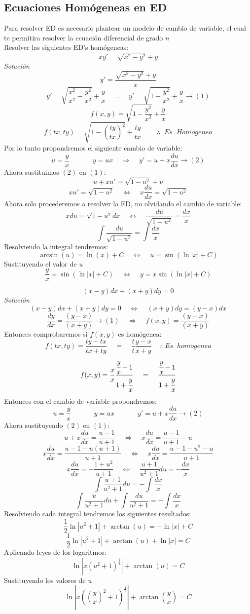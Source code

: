 \documentclass[10pt]{article}
\begin{document}
\subsection{Ecuaciones Homógeneas en ED}
Para resolver ED es necesario plantear un modelo de cambio de variable, el cual te permitira resolver la ecuación diferencial de grado $n$\\
Resolver las siguientes ED's homógeneas:
\[xy'=\sqrt{x^{2}-y^{2}}+y\]
\textit{Solución}
\[y'=\frac{\sqrt{x^{2}-y^{2}}+y}{x}\]
\[y'=\sqrt{\frac{x^{2}}{x^{2}}-\frac{y^{2}}{x^{2}}}+\frac{y}{x}\;\;\;\;\;\ldots\;\;\;\;y'=\sqrt{1-\frac{y^{2}}{x^{2}}}+\frac{y}{x}\rightarrow (1)\]
\[f(x,y)=\sqrt{1-\frac{y^{2}}{x^{2}}}+\frac{y}{x}\]
\[f(tx,ty)=\sqrt{1-\left(\frac{ty}{tx}\right)^{2}}+\frac{ty}{tx}\;\;\;\;\;\;\;\;\therefore\;\;Es\;\;Hom\acute{o}genea\]
Por lo tanto propondremos el siguiente cambio de variable:
\[u=\frac{y}{x}\;\;\;\;\;\;\;\;\;\;\;\;y=ux\;\;\;\;\Rightarrow\;\;\;\;y'=u+x\frac{du}{dx}\rightarrow(2)\]
Ahora sustituimos $(2)$ en $(1)$:
\[u+xu'=\sqrt{1-u^{2}}+u\]
\[xu'=\sqrt{1-u^{2}}\;\;\;\;\Leftrightarrow\;\;\;\;x\frac{du}{dx}=\sqrt{1-u^{2}}\]
Ahora solo procederemos a resolver la ED, no olvidando el cambio de variable:
\[xdu=\sqrt{1-u^{2}}dx\;\;\;\;\Leftrightarrow\;\;\;\;\frac{du}{\sqrt{1-u^{2}}}=\frac{dx}{x}\]
\[\int\frac{du}{\sqrt{1-u^{2}}}=\int\frac{dx}{x}\]
Resolviendo la integral tendremos:
\[\arcsin(u)=\ln(x)+C\;\;\;\;\Leftrightarrow\;\;\;\;u=\sin\left(\ln\left|x\right|+C\right)\]
Sustituyendo el valor de $u$
\[\frac{y}{x}=\sin\left(\ln\left|x\right|+C\right)\;\;\;\;\Leftrightarrow\;\;\;\;y=x\sin\left(\ln\left|x\right|+C\right)\]

\clearpage
\[(x-y)dx+(x+y)dy=0\]
\textit{Solución}
\[(x-y)dx+(x+y)dy=0\;\;\;\;\Leftrightarrow\;\;\;\;(x+y)dy=(y-x)dx\]
\[\frac{dy}{dx}=\frac{(y-x)}{(x+y)}\rightarrow(1)\;\;\;\;\Rightarrow\;\;\;\;f(x,y)=\frac{(y-x)}{(x+y)}\]
Entonces comprobaremos si $f(x,y)$ es homógenea:
\[f(tx,ty)=\frac{ty-tx}{tx+ty}\;\;\;\;=\;\;\;\;\frac{t}{t}\frac{y-x}{x+y}\;\;\;\;\therefore\;Es\;\;hom\acute{o}genea\]
\[f(x,y)=\frac{x}{x}\frac{\cfrac{y}{x}-1}{1+\cfrac{y}{x}}\;\;\;\;=\;\;\;\;\frac{\cfrac{y}{x}-1}{1+\cfrac{y}{x}}\]
Entonces con el cambio de variable propondremos:
\[u=\frac{y}{x}\;\;\;\;\;\;\;\;\;\;\;\;y=ux\;\;\;\;\;\;\;\;\;\;\;\;y'=u+x\frac{du}{dx}\rightarrow(2)\]
Ahora sustituyendo $(2)$ en $(1)$:
\[u+x\frac{du}{dx}=\frac{u-1}{u+1}\;\;\;\;\Leftrightarrow \;\;\;\;x\frac{du}{dx}=\frac{u-1}{u+1}-u\]
\[x\frac{du}{dx}=\frac{u-1-u(u+1)}{u+1}\;\;\;\;\Leftrightarrow \;\;\;\;x\frac{du}{dx}=\frac{u-1-u^{2}-u}{u+1}\]
\[x\frac{du}{dx}=-\frac{1+u^{2}}{u+1}\;\;\;\;\Leftrightarrow \;\;\;\;\frac{u+1}{u^{2}+1}du=-\frac{dx}{x}\]
\[\int\frac{u+1}{u^{2}+1}du=-\int\frac{dx}{x}\]
\[\int\frac{u}{u^{2}+1}du+\int\frac{du}{u^{2}+1}=-\int\frac{dx}{x}\]
Resolviendo cada integral tendremos los siguientes resultados:
\[\frac{1}{2}\ln\left|u^{2}+1\right|+\arctan(u)=-\ln\left|x\right|+C\]
\[\frac{1}{2}\ln\left|u^{2}+1\right|+\arctan(u)+\ln\left|x\right|=C\]
Aplicando leyes de los logaritmos:
\[\ln\left|x\left(u^{2}+1\right)^{\frac{1}{2}}\right|+\arctan(u)=C\]
Sustituyendo los valores de $u$
\[\ln\left|x\left(\left(\frac{y}{x}\right)^{2}+1\right)^{\frac{1}{2}}\right|+\arctan\left(\frac{y}{x}\right)=C\]
\end{document}
